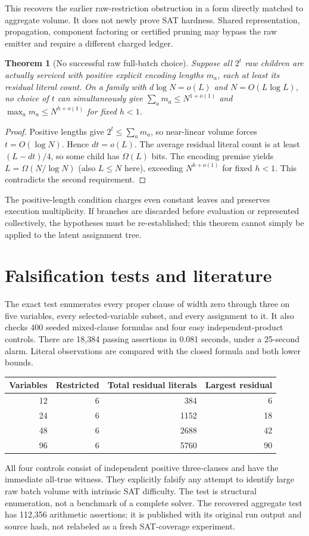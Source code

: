 \documentclass[11pt]{article}
\newtheorem{theorem}{Theorem}
\begin{document}
This recovers the earlier raw-restriction obstruction in a form directly
matched to aggregate volume. It does not newly prove SAT hardness.
Shared representation, propagation, component factoring or certified
pruning may bypass the raw emitter and require a different charged ledger.

\begin{theorem}[No successful raw full-batch choice]
Suppose all $2^t$ raw children are actually serviced with positive explicit
encoding lengths $m_a$, each at least its residual literal count. On a
family with $d\log N=o(L)$ and $N=O(L\log L)$, no choice of $t$ can
simultaneously give $\sum_a m_a\le N^{1+o(1)}$ and
$\max_a m_a\le N^{h+o(1)}$ for fixed $h<1$.
\end{theorem}
\begin{proof}
Positive lengths give $2^t\le\sum_a m_a$, so near-linear volume forces
$t=O(\log N)$. Hence $dt=o(L)$. The average residual literal count is
at least $(L-dt)/4$, so some child has $\Omega(L)$ bits. The encoding
premise yields $L=\Omega(N/\log N)$ (also $L\le N$ here), exceeding
$N^{h+o(1)}$ for fixed $h<1$. This contradicts the second requirement.
\end{proof}
The positive-length condition charges even constant leaves and preserves
execution multiplicity. If branches are discarded before evaluation or
represented collectively, the hypotheses must be re-established; this
theorem cannot simply be applied to the latent assignment tree.

\section{Falsification tests and literature}
The exact test enumerates every proper clause of width zero through
three on five variables, every selected-variable subset, and every
assignment to it. It also checks 400 seeded mixed-clause formulas and
four easy independent-product controls. There are 18,384 passing
assertions in 0.081 seconds, under a 25-second alarm. Literal observations
are compared with the closed formula and both lower bounds.

\begin{center}
\begin{tabular}{rrrr}
\toprule
Variables & Restricted & Total residual literals & Largest residual\\
\midrule
12&6&384&6\\
24&6&1152&18\\
48&6&2688&42\\
96&6&5760&90\\
\bottomrule
\end{tabular}
\end{center}
All four controls consist of independent positive three-clauses and
have the immediate all-true witness. They explicitly falsify any attempt
to identify large raw batch volume with intrinsic SAT difficulty. The
test is structural enumeration, not a benchmark of a complete solver.
The recovered aggregate test has 112,356 arithmetic assertions; it is
published with its original run output and source hash, not relabeled as
a fresh SAT-coverage experiment.
\end{document}
